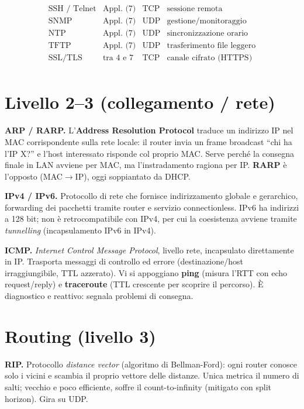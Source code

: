 \documentclass[11pt,a4paper]{report}
\begin{document}
\[\begin{array}{l|l|l|l}
\text{SSH / Telnet} & \text{Appl. (7)} & \text{TCP} & \text{sessione remota} \\
\text{SNMP} & \text{Appl. (7)} & \text{UDP} & \text{gestione/monitoraggio} \\
\text{NTP} & \text{Appl. (7)} & \text{UDP} & \text{sincronizzazione orario} \\
\text{TFTP} & \text{Appl. (7)} & \text{UDP} & \text{trasferimento file leggero} \\
\text{SSL/TLS} & \text{tra 4 e 7} & \text{TCP} & \text{canale cifrato (HTTPS)} \\
\end{array}
\]

\section*{Livello 2--3 (collegamento / rete)}

\textbf{ARP / RARP.} L'\textbf{Address Resolution Protocol} traduce un indirizzo
IP nel MAC corrispondente sulla rete locale: il router invia un frame broadcast
``chi ha l'IP X?'' e l'host interessato risponde col proprio MAC. Serve perché
la consegna finale in LAN avviene per MAC, ma l'instradamento ragiona per IP.
\textbf{RARP} è l'opposto (MAC$\to$IP), oggi soppiantato da DHCP.

\textbf{IPv4 / IPv6.} Protocollo di rete che fornisce indirizzamento globale e
gerarchico, forwarding dei pacchetti tramite router e servizio connectionless.
IPv6 ha indirizzi a 128 bit; non è retrocompatibile con IPv4, per cui la
coesistenza avviene tramite \emph{tunnelling} (incapsulamento IPv6 in IPv4).

\textbf{ICMP.} \emph{Internet Control Message Protocol}, livello rete, incapsulato
direttamente in IP. Trasporta messaggi di controllo ed errore (destinazione/host
irraggiungibile, TTL azzerato). Vi si appoggiano \textbf{ping} (misura l'RTT con
echo request/reply) e \textbf{traceroute} (TTL crescente per scoprire il
percorso). È diagnostico e reattivo: segnala problemi di consegna.

\section*{Routing (livello 3)}

\textbf{RIP.} Protocollo \emph{distance vector} (algoritmo di Bellman-Ford):
ogni router conosce solo i vicini e scambia il proprio vettore delle distanze.
Unica metrica il numero di salti; vecchio e poco efficiente, soffre il
count-to-infinity (mitigato con split horizon). Gira su UDP.
\end{document}

